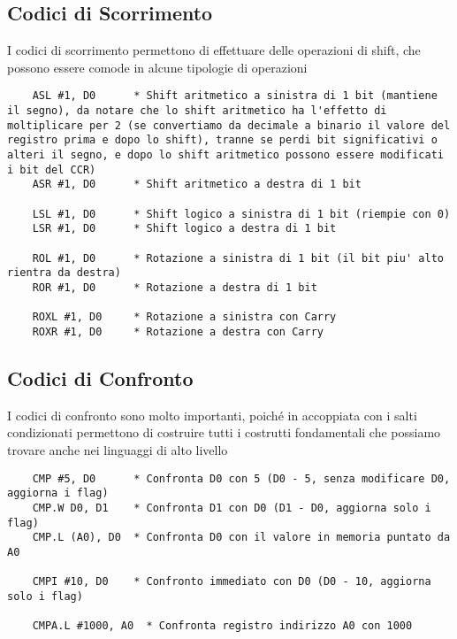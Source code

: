 \subsection{Codici di Scorrimento}
I codici di scorrimento permettono di effettuare delle operazioni di shift, che possono essere comode in alcune tipologie di operazioni
\begin{lstlisting}
    ASL #1, D0      * Shift aritmetico a sinistra di 1 bit (mantiene il segno), da notare che lo shift aritmetico ha l'effetto di moltiplicare per 2 (se convertiamo da decimale a binario il valore del registro prima e dopo lo shift), tranne se perdi bit significativi o alteri il segno, e dopo lo shift aritmetico possono essere modificati i bit del CCR)
    ASR #1, D0      * Shift aritmetico a destra di 1 bit

    LSL #1, D0      * Shift logico a sinistra di 1 bit (riempie con 0)
    LSR #1, D0      * Shift logico a destra di 1 bit

    ROL #1, D0      * Rotazione a sinistra di 1 bit (il bit piu' alto rientra da destra)
    ROR #1, D0      * Rotazione a destra di 1 bit

    ROXL #1, D0     * Rotazione a sinistra con Carry
    ROXR #1, D0     * Rotazione a destra con Carry
\end{lstlisting}

\subsection{Codici di Confronto} \label{par:confronto}
I codici di confronto sono molto importanti, poiché in accoppiata con i salti condizionati permettono di costruire tutti i costrutti fondamentali che possiamo trovare anche nei linguaggi di alto livello
\begin{lstlisting}
    CMP #5, D0      * Confronta D0 con 5 (D0 - 5, senza modificare D0, aggiorna i flag)
    CMP.W D0, D1    * Confronta D1 con D0 (D1 - D0, aggiorna solo i flag)
    CMP.L (A0), D0  * Confronta D0 con il valore in memoria puntato da A0

    CMPI #10, D0    * Confronto immediato con D0 (D0 - 10, aggiorna solo i flag)

    CMPA.L #1000, A0  * Confronta registro indirizzo A0 con 1000
\end{lstlisting}

